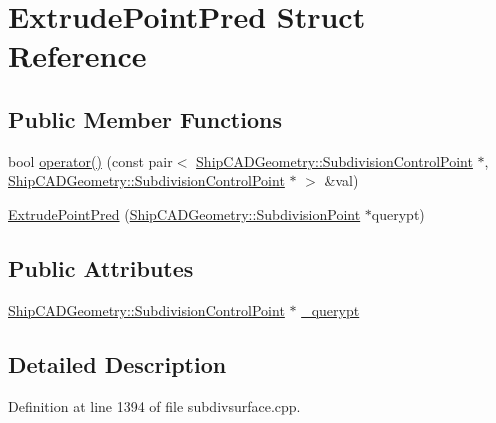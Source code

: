 \hypertarget{structExtrudePointPred}{\section{Extrude\-Point\-Pred Struct Reference}
\label{structExtrudePointPred}
}
\subsection*{Public Member Functions}
\begin{DoxyCompactItemize}
\item 
bool \hyperlink{structExtrudePointPred_a7ac7838d7a3a253959fa6c32d7e9d10a}{operator()} (const pair$<$ \hyperlink{classShipCADGeometry_1_1SubdivisionControlPoint}{Ship\-C\-A\-D\-Geometry\-::\-Subdivision\-Control\-Point} $\ast$, \hyperlink{classShipCADGeometry_1_1SubdivisionControlPoint}{Ship\-C\-A\-D\-Geometry\-::\-Subdivision\-Control\-Point} $\ast$ $>$ \&val)
\item 
\hyperlink{structExtrudePointPred_a05facd247eb421d19b01c75f9cc5907f}{Extrude\-Point\-Pred} (\hyperlink{classShipCADGeometry_1_1SubdivisionPoint}{Ship\-C\-A\-D\-Geometry\-::\-Subdivision\-Point} $\ast$querypt)
\end{DoxyCompactItemize}
\subsection*{Public Attributes}
\begin{DoxyCompactItemize}
\item 
\hyperlink{classShipCADGeometry_1_1SubdivisionControlPoint}{Ship\-C\-A\-D\-Geometry\-::\-Subdivision\-Control\-Point} $\ast$ \hyperlink{structExtrudePointPred_a418b8e48a02f969ff11edb43c0ed010c}{\-\_\-querypt}
\end{DoxyCompactItemize}


\subsection{Detailed Description}


Definition at line 1394 of file subdivsurface.\-cpp.



